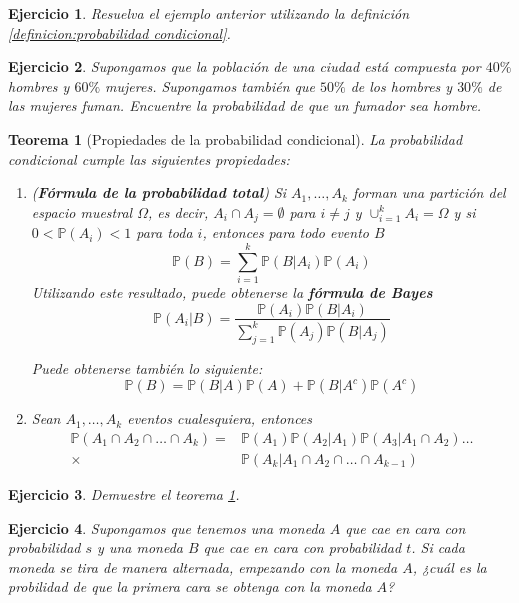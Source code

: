 \documentclass[11pt]{report}
\theoremstyle{break}
\newtheorem{teorema}{Teorema}[chapter]
\newtheorem{ejercicio}{Ejercicio}[chapter]
\theoremstyle{break}
\begin{document}
\begin{ejercicio}
Resuelva el ejemplo anterior utilizando la definición \ref{definicion:probabilidad condicional}.
\end{ejercicio}

\begin{ejercicio}
Supongamos que la población de una ciudad está compuesta por $40\%$ hombres y $60\%$ mujeres. Supongamos también que $50\%$ de los hombres y $30\%$ de las mujeres fuman. Encuentre la probabilidad de que un fumador sea hombre.
\end{ejercicio}

\begin{teorema}[Propiedades de la probabilidad condicional]
\label{teorema:propiedades probabilidad condicional}
La probabilidad condicional cumple las siguientes propiedades:
\begin{enumerate}[label=\alph*)]
\item (\textbf{Fórmula de la probabilidad total}) Si $A_1, \ldots, A_k$ forman una partición del espacio muestral $\Omega$, es decir, $A_i \cap A_j = \emptyset$ para $i \neq j$ y $\cup_{i=1}^{k}A_i = \Omega$ y si $0 < \mathbb{P}(A_i) < 1$ para toda $i$, entonces para todo evento $B$
$$
\mathbb{P}(B) = \sum_{i=1}^{k}\mathbb{P}(B|A_i)\mathbb{P}(A_i)
$$
Utilizando este resultado, puede obtenerse la \textbf{fórmula de Bayes}
$$
\mathbb{P}(A_i|B) = \dfrac{\mathbb{P}(A_i) \mathbb{P}(B|A_i) }{\sum_{j=1}^{k} \mathbb{P}(A_j) \mathbb{P}(B|A_j)}
$$

Puede obtenerse también lo siguiente:
$$
\mathbb{P}(B) = \mathbb{P}(B|A)\mathbb{P}(A) + \mathbb{P}(B|A^c)\mathbb{P}(A^c)
$$

\item Sean $A_1, \ldots, A_k$ eventos cualesquiera, entonces
\begin{align*}
\mathbb{P}(A_1 \cap A_2 \cap \ldots \cap A_k)  = & \mathbb{P}(A_1)\mathbb{P}(A_2|A_1)\mathbb{P}(A_3|A_1 \cap A_2)\ldots \\
 \times & \mathbb{P}(A_k|A_1 \cap A_2 \cap \ldots \cap A_{k-1})
\end{align*}
\end{enumerate}
\end{teorema}
\begin{ejercicio}
Demuestre el teorema \ref{teorema:propiedades probabilidad condicional}.
\end{ejercicio}
\begin{ejercicio}
Supongamos que tenemos una moneda $A$ que cae en cara con probabilidad $s$ y una moneda $B$ que cae en cara con probabilidad $t$. Si cada moneda se tira de manera alternada, empezando con la moneda $A$, ¿cuál es la probilidad de que la primera cara se obtenga con la moneda $A$?
\end{ejercicio}
\end{document}
